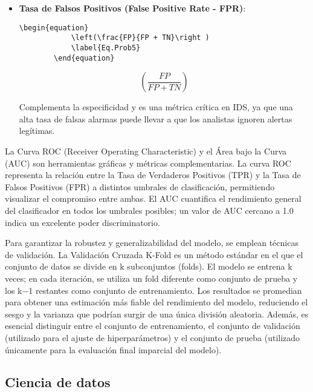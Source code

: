\begin{itemize}
    \item\textbf{Tasa de Falsos Positivos (False Positive Rate - FPR)}: 
        \begin{lstlisting}[language={[LaTeX]TeX},caption={Definición de una ecuación para la tasa de falsos positivos},label=List.Ecuacion]
        \begin{equation}
            \left(\frac{FP}{FP + TN}\right )
            \label{Eq.Prob5}
        \end{equation}
        \end{lstlisting}

        \begin{equation}
            \left(\frac{FP}{FP + TN}\right )
            \label{Eq.Prob5}
        \end{equation}
    

     Complementa la especificidad y es una métrica crítica en IDS, ya que una alta tasa de falsas alarmas puede llevar a que los analistas ignoren alertas legítimas.

\end{itemize}
La Curva ROC (Receiver Operating Characteristic) y el Área bajo la Curva (AUC) son herramientas gráficas y métricas complementarias. La curva ROC representa la relación entre la Tasa de Verdaderos Positivos (TPR) y la Tasa de Falsos Positivos (FPR) a distintos umbrales de clasificación, permitiendo visualizar el compromiso entre ambas. El AUC cuantifica el rendimiento general del clasificador en todos los umbrales posibles; un valor de AUC cercano a 1.0 indica un excelente poder discriminatorio.

Para garantizar la robustez y generalizabilidad del modelo, se emplean técnicas de validación. La Validación Cruzada K-Fold es un método estándar en el que el conjunto de datos se divide en k subconjuntos (folds). El modelo se entrena k veces; en cada iteración, se utiliza un fold diferente como conjunto de prueba y los k−1 restantes como conjunto de entrenamiento. Los resultados se promedian para obtener una estimación más fiable del rendimiento del modelo, reduciendo el sesgo y la varianza que podrían surgir de una única división aleatoria. Además, es esencial distinguir entre el conjunto de entrenamiento, el conjunto de validación (utilizado para el ajuste de hiperparámetros) y el conjunto de prueba (utilizado únicamente para la evaluación final imparcial del modelo).

\subsection{Ciencia de datos}\label{Sec.Referencias}

